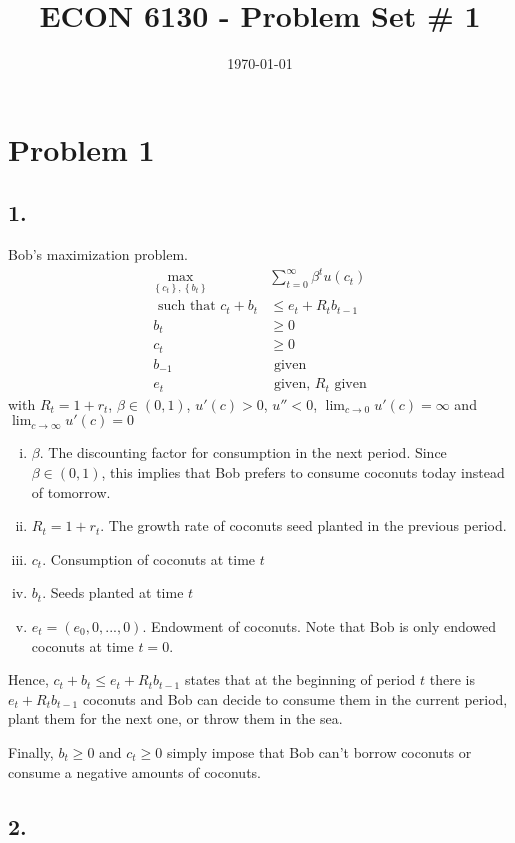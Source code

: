 \documentclass[12pt]{article}
\title{ECON 6130 - Problem Set \# 1}
\date{\today}
\theoremstyle{definition}
\newcommand\st{\text{ such that }}
\newcommand{\cbra}[1]{\left\{#1\right\}}
\begin{document}
\maketitle

\section*{Problem 1}
\subsection*{1.}

Bob's maximization problem.
\[
\begin{split}
\underset{\cbra{c_t},\cbra{b_t}}{\max} &\sum_{t=0}^{\infty}\beta^t u(c_t) \\
\st c_t+b_t &\leq  e_t+R_tb_{t-1}\\
b_t &\geq 0\\
c_t &\geq 0\\
b_{-1} &\text{ given}\\
e_t &\text{ given, } R_t \text{ given}
\end{split}
\]
with $R_t=1+r_t$, $\beta \in (0,1)$, $u'(c)>0$, $u''<0$, $\lim_{c\to 0 } u'(c)=\infty$ and $\lim_{c\to \infty } u'(c)=0$ 

\begin{enumerate}[(i)]
	\item $\beta$. The discounting factor for consumption in the next period. Since $\beta \in (0,1)$, this implies that Bob prefers to consume coconuts today instead of tomorrow.
	\item $R_t=1+r_t$. The growth rate of coconuts seed planted in the previous period.
	\item $c_t$. Consumption of coconuts at time $t$
	\item $b_t$. Seeds planted at time $t$
	\item $e_t=(e_0,0,...,0)$. Endowment of coconuts. Note that Bob is only endowed coconuts at time $t=0$.
\end{enumerate}

Hence, $c_t+b_t \leq  e_t+R_tb_{t-1}$ states that at the beginning of period $t$ there is $e_t+R_tb_{t-1}$ coconuts and Bob can decide to consume them in the current period, plant them for the next one, or throw them in the sea.

Finally, $b_t \geq 0$ and $c_t \geq 0$ simply impose that Bob can't borrow coconuts or consume a negative amounts of coconuts.
\subsection*{2.}
\end{document}
